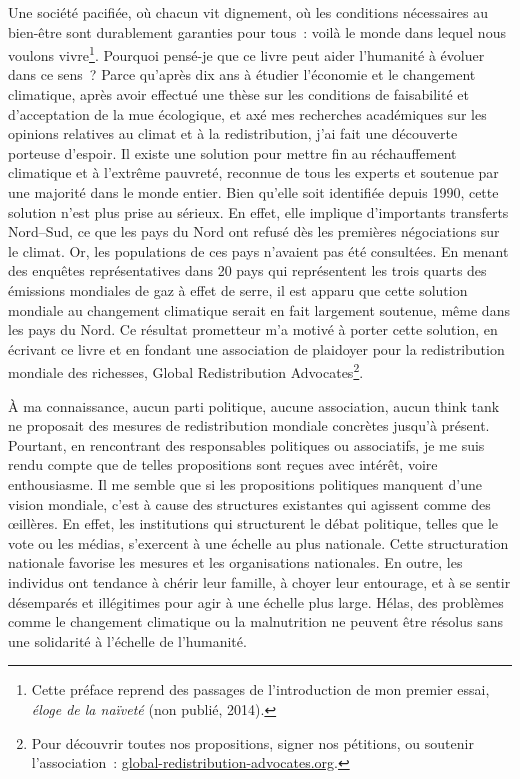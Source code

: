 \documentclass[a5paper,french]{memoir}
\begin{document}
Une société pacifiée, où chacun vit dignement, où les conditions nécessaires au bien-être sont durablement garanties pour tous~: voilà le monde dans lequel nous voulons vivre\footnote{Cette préface reprend des passages de l'introduction de mon premier essai, \textit{éloge de la naïveté} (non publié, 2014).}. Pourquoi pensé-je que ce livre peut aider l'humanité à évoluer dans ce sens~? Parce qu'après dix ans à étudier l'économie et le changement climatique, après avoir effectué une thèse sur les conditions de faisabilité et d'acceptation de la mue écologique, et axé mes recherches académiques sur les opinions relatives au climat et à la redistribution, j'ai fait une découverte porteuse d'espoir. Il existe une solution pour mettre fin au réchauffement climatique et à l'extrême pauvreté, reconnue de %
tous les experts et soutenue par une majorité dans le monde entier. 
Bien qu'elle soit identifiée depuis 1990, cette solution n'est plus prise au sérieux. En effet, elle implique d'importants transferts Nord--Sud, ce que les pays du Nord ont refusé dès les premières négociations sur le climat. Or, les populations de ces pays n'avaient pas été consultées. En menant des enquêtes représentatives dans 20 pays qui représentent les trois quarts des émissions mondiales de gaz à effet de serre, il est apparu que cette solution mondiale au changement climatique serait en fait largement soutenue, même dans les pays du Nord. 
Ce résultat prometteur m'a motivé à porter cette solution, en écrivant ce livre et en fondant une association de plaidoyer pour la redistribution mondiale des richesses, Global Redistribution Advocates\footnote{Pour découvrir toutes nos propositions, signer nos pétitions, ou soutenir l'association~: \href{http://global-redistribution-advocates.org/}{global-redistribution-advocates.org}.}.

À ma connaissance, aucun parti politique, aucune association, aucun think tank ne proposait des mesures de redistribution mondiale concrètes jusqu'à présent. Pourtant, en rencontrant des responsables politiques ou associatifs, je me suis rendu compte que de telles propositions sont reçues avec intérêt, voire enthousiasme. Il me semble que si les propositions politiques manquent d'une vision mondiale, c'est à cause des structures existantes qui agissent comme des œillères. En effet, les institutions qui structurent le débat politique, telles que le vote ou les médias, s'exercent à une échelle au plus nationale. Cette structuration nationale favorise les mesures et les organisations nationales. En outre, les individus ont tendance à chérir leur famille, à choyer leur entourage, et à se sentir désemparés et illégitimes pour agir à une échelle plus large. %
Hélas, des problèmes comme le changement climatique ou la malnutrition ne peuvent être résolus sans une solidarité à l'échelle de l'humanité. 
\end{document}
